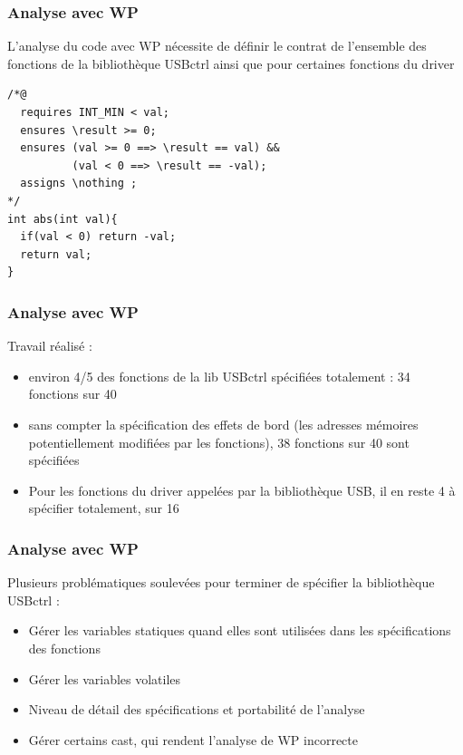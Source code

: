 \documentclass[french]{beamer}
\begin{document}
 \begin{frame}[containsverbatim]
 \frametitle{Analyse avec WP}


 \justifyit L'analyse du code avec WP nécessite de définir le contrat de l'ensemble des fonctions de la bibliothèque USBctrl ainsi que pour certaines fonctions du driver

\begin{lstlisting}[frame=single]
/*@
  requires INT_MIN < val;
  ensures \result >= 0;
  ensures (val >= 0 ==> \result == val) &&
          (val < 0 ==> \result == -val);
  assigns \nothing ;
*/
int abs(int val){
  if(val < 0) return -val;
  return val;
}
\end{lstlisting}

 \end{frame}

 \begin{frame}
 \frametitle{Analyse avec WP}

 Travail réalisé :
 \begin{itemize}
 \item environ 4/5 des fonctions de la lib USBctrl spécifiées totalement : 34 fonctions sur 40
 \item \justifyit sans compter la spécification des effets de bord (les adresses mémoires potentiellement modifiées par les fonctions), 38 fonctions sur 40 sont spécifiées
 \item \justifyit Pour les fonctions du driver appelées par la bibliothèque USB, il en reste 4 à spécifier totalement, sur 16


 \end{itemize}

 \end{frame}

  \begin{frame}
  \frametitle{Analyse avec WP}

  Plusieurs problématiques soulevées pour terminer de spécifier la bibliothèque USBctrl :
 \begin{itemize}
 	\item Gérer les variables statiques quand elles sont utilisées dans les spécifications des fonctions
 	\item Gérer les variables volatiles
 	\item Niveau de détail des spécifications et portabilité de l'analyse
 	\item Gérer certains cast, qui rendent l'analyse de WP incorrecte
 \end{itemize}

 \end{frame}
\end{document}
